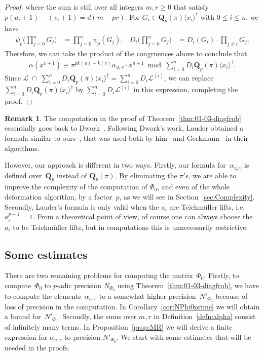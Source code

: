\documentclass[a4paper,11pt]{article}
\numberwithin{equation}{section}
\newcommand{\QQ}{\mathbf{Q}} %
\theoremstyle{definition}
\newtheorem{rem}[thm]{Remark}
\begin{document}
\begin{proof}
where the sum is still over all integers $m, r \geq 0$  that satisfy $p(u_i+1)-(v_i+1)=d(m-pr)$. 
For $G_i \in  \QQ_p(\pi) \langle x_i \rangle^{\dag}$ with $0 \leq i \leq n$, we have
\begin{align*}
  \psi_p \biggl( \prod_{j=0}^n G_j \biggr) &= \prod_{j=0}^n \psi_p(G_j), 
& D_i \biggl( \prod_{j=0}^n G_j \biggr) &= D_i(G_i) \cdot \prod_{j \neq i} G_j.  
\end{align*}
Therefore, we can take the product of the congruences above to conclude that 
\begin{align*}
\alpha(x^{v+1}) \equiv \pi^{pk(u)-k(v)} \alpha_{u,v} \cdot x^{u+1} \bmod{\sum_{i=0}^n D_i \QQ_p(\pi) \langle x_i \rangle^{\dag}}.
\end{align*}
Since
$\mathcal{L} \; \cap \; \sum_{i=0}^n D_i \QQ_p(\pi) \langle x_i \rangle^{\dag} =  \sum_{i=0}^n D_i \mathcal{L}^{(i)}$,
we can replace $\sum_{i=0}^n D_i \QQ_p(\pi) \langle x_i \rangle^{\dag}$ 
by $\sum_{i=0}^n D_i \mathcal{L}^{(i)}$ in this expression, completing the proof.
\end{proof}

\begin{rem}
The computation in the proof of Theorem~\ref{thm:01-03-diagfrob} essentially 
goes back to Dwork~\citep[\S 4]{Dwork1964}.  Following Dwork's work, Lauder 
obtained a formula similar to ours~\citep[Proposition 10]{Lauder2004b}, that
was used both by him~\citep{Lauder2004b} and Gerkmann~\citep{Gerkmann2007} 
in their algorithms. 

However, our approach is different in two ways.  Firstly, our formula 
for~$\alpha_{u,v}$ is defined over~$\QQ_p$ instead of $\QQ_p(\pi)$. By 
eliminating the $\pi$'s, we are able to improve the complexity of
the computation of $\Phi_0$, and even of the whole deformation algorithm, 
by a factor~$p$, as we will see in Section~\ref{sec:Complexity}. Secondly, 
Lauder's formula is only valid when the $a_i$ are Teichm\"uller lifts, 
i.e.\ $a_i^{p-1}=1$. From a theoretical point of view, of course one can 
always choose the $a_i$ to be Teichm\"uller lifts, but in computations 
this is unnecessarily restrictive. 
\end{rem}

\subsection{Some estimates}

There are two remaining problems for computing the matrix~$\Phi_0$. Firstly, to 
compute~$\Phi_0$ to $p$-adic precision $N_{\Phi_0}$ using Theorem~\ref{thm:01-03-diagfrob}, 
we have to compute the elements~$\alpha_{u,v}$ to a somewhat higher precision~$N'_{\Phi_0}$ 
because of loss of precision in the computation. In Corollary~\ref{cor:NPhi0prime} we will 
obtain a bound for~$N'_{\Phi_0}$. Secondly, the sums over $m,r$ in Definition~\ref{defn:alpha} 
consist of infinitely many terms.  In Proposition~\ref{prop:MR} we will derive a finite 
expression for $\alpha_{u,v}$ to precision $N'_{\Phi_0}$. We start with some estimates that 
will be needed in the proofs.
\end{document}
